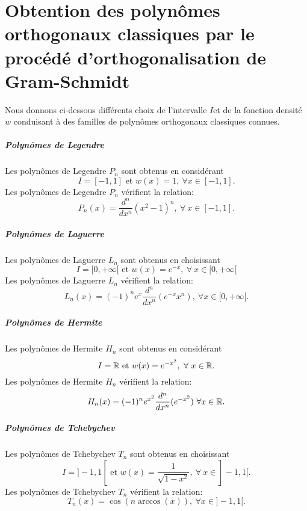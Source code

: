 \chapter{Obtention des polynômes orthogonaux classiques par le procédé d'orthogonalisation de Gram-Schmidt}
Nous donnons ci-dessous différents choix de l'intervalle $I$et de la fonction densité $w$ conduisant à des familles de polynômes orthogonaux classiques connues.

\paragraph{Polynômes de Legendre}
$ $\\Les polynômes de Legendre $P_n$ sont obtenus en considérant $$I=[-1,1] \text{ et } w(x)=1,\ \forall x\in [-1,1].$$
Les polynômes de Legendre $P_n$ vérifient la relation: $$ P_n(x)=\dfrac{d^n}{dx^n}(x^2-1)^n,\ \forall\ x\in [-1,1].$$
\paragraph{Polynômes de Laguerre}
$ $\\Les polynômes de Laguerre $L_n$ sont obtenus en choisissant $$I=[0,+\infty[ \text{ et } w(x)=e^{-x}, \ \forall \ x\in [0,+\infty[$$
Les polynômes de Laguerre $L_n$ vérifient la relation:$$ L_n(x)=(-1)^n e^x \frac{d^n}{dx^n}(e^{-x}x^n), \ \forall x\in [0,+\infty[.$$
\paragraph{Polynômes de Hermite}
$ $\\Les polynômes de Hermite $H_n$ sont obtenus en considérant $$I=\mathbb R \text{ et } w(x)=e^{-x^2},\ \forall \ x \in \mathbb R.$$
Les polynômes de Hermite $H_n$ vérifient la relation:
$$ H_n(x)=(-1)^n e^{x^2}\dfrac{d^n}{dx^n}(e^{-x^2})\ \forall x\in \mathbb R.$$
\paragraph{Polynômes de Tchebychev}
$ $\\Les polynômes de Tchebychev $T_n$ sont obtenus en choisissant $$ I=]-1,1[ \text{ et } w(x)=\dfrac{1}{\sqrt{1-x^2}}, \ \forall \ x\in ]-1,1[.$$
Les polynômes de Tchebychev $T_n$ vérifient la relation:$$ T_n(x)=\cos(n \arccos(x)),\ \forall x\in ]-1,1[.$$